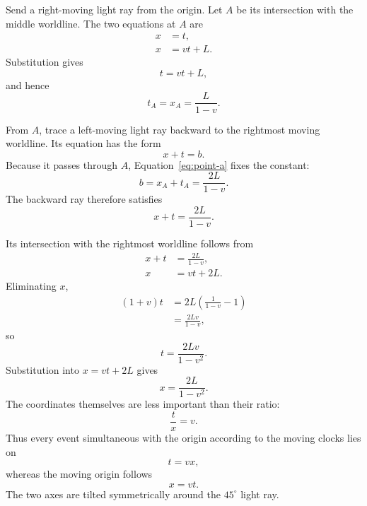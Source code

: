 Send a right-moving light ray from the origin. Let \(A\) be its intersection with the middle worldline. The two equations at \(A\) are
\begin{align}
x&=t,\\
x&=vt+L.
\end{align}
Substitution gives
\begin{equation}
t=vt+L,
\end{equation}
and hence
\begin{equation}
t_A=x_A=\frac{L}{1-v}.
\label{eq:point-a}
\end{equation}

From \(A\), trace a left-moving light ray backward to the rightmost moving worldline. Its equation has the form
\begin{equation}
x+t=b.
\end{equation}
Because it passes through \(A\), Equation~\eqref{eq:point-a} fixes the constant:
\begin{equation}
b=x_A+t_A=\frac{2L}{1-v}.
\end{equation}
The backward ray therefore satisfies
\begin{equation}
x+t=\frac{2L}{1-v}.
\label{eq:backward-ray}
\end{equation}

Its intersection with the rightmost worldline follows from
\begin{align}
x+t&=\frac{2L}{1-v},\\
x&=vt+2L.
\end{align}
Eliminating \(x\),
\begin{align}
(1+v)t
  &=2L\left(\frac{1}{1-v}-1\right)\\
  &=\frac{2Lv}{1-v},
\end{align}
so
\begin{equation}
t=\frac{2Lv}{1-v^2}.
\end{equation}
Substitution into \(x=vt+2L\) gives
\begin{equation}
x=\frac{2L}{1-v^2}.
\end{equation}
The coordinates themselves are less important than their ratio:
\begin{equation}
\frac{t}{x}=v.
\end{equation}
Thus every event simultaneous with the origin according to the moving clocks lies on
\begin{equation}
t=vx,
\label{eq:simultaneity-c-one}
\end{equation}
whereas the moving origin follows
\begin{equation}
x=vt.
\label{eq:moving-time-axis}
\end{equation}
The two axes are tilted symmetrically around the \(45^\circ\) light ray.

